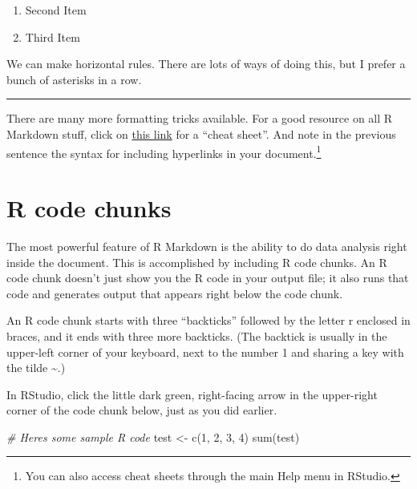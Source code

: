 \documentclass[
]{book}
\newenvironment{Shaded}{\begin{snugshade}}{\end{snugshade}}
\newcommand{\CommentTok}[1]{\textcolor[rgb]{0.56,0.35,0.01}{\textit{#1}}}
\newcommand{\DecValTok}[1]{\textcolor[rgb]{0.00,0.00,0.81}{#1}}
\newcommand{\FunctionTok}[1]{\textcolor[rgb]{0.00,0.00,0.00}{#1}}
\newcommand{\NormalTok}[1]{#1}
\newcommand{\OtherTok}[1]{\textcolor[rgb]{0.56,0.35,0.01}{#1}}
\providecommand{\tightlist}{%
  \setlength{\itemsep}{0pt}\setlength{\parskip}{0pt}}
\begin{document}
\begin{enumerate}
\def\labelenumi{\arabic{enumi}.}
\setcounter{enumi}{1}
\tightlist
\item
  Second Item
\item
  Third Item
\end{enumerate}

We can make horizontal rules. There are lots of ways of doing this, but I prefer a bunch of asterisks in a row.

\begin{center}\rule{0.5\linewidth}{0.5pt}\end{center}

There are many more formatting tricks available. For a good resource on all R Markdown stuff, click on \href{https://www.rstudio.com/wp-content/uploads/2015/03/rmarkdown-reference.pdf}{this link} for a ``cheat sheet''. And note in the previous sentence the syntax for including hyperlinks in your document.\footnote{You can also access cheat sheets through the main Help menu in RStudio.}

\hypertarget{rmark-codechunks}{%
\section{R code chunks}\label{rmark-codechunks}}

The most powerful feature of R Markdown is the ability to do data analysis right inside the document. This is accomplished by including R code chunks. An R code chunk doesn't just show you the R code in your output file; it also runs that code and generates output that appears right below the code chunk.

An R code chunk starts with three ``backticks'' followed by the letter r enclosed in braces, and it ends with three more backticks. (The backtick is usually in the upper-left corner of your keyboard, next to the number 1 and sharing a key with the tilde \textasciitilde.)

In RStudio, click the little dark green, right-facing arrow in the upper-right corner of the code chunk below, just as you did earlier.

\begin{Shaded}
\begin{Highlighting}[]
\CommentTok{\# Here\textquotesingle{}s some sample R code}
\NormalTok{test }\OtherTok{\textless{}{-}} \FunctionTok{c}\NormalTok{(}\DecValTok{1}\NormalTok{, }\DecValTok{2}\NormalTok{, }\DecValTok{3}\NormalTok{, }\DecValTok{4}\NormalTok{)}
\FunctionTok{sum}\NormalTok{(test)}
\end{Highlighting}
\end{Shaded}
\end{document}
